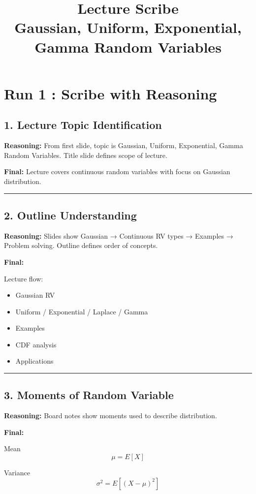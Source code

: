 \documentclass[12pt]{article}
\title{Lecture Scribe \\ Gaussian, Uniform, Exponential, Gamma Random Variables}
\author{}
\date{}
\begin{document}
\maketitle

\section*{Run 1 : Scribe with Reasoning}

\subsection*{1. Lecture Topic Identification}

\textbf{Reasoning:}  
From first slide, topic is Gaussian, Uniform, Exponential, Gamma Random Variables.  
Title slide defines scope of lecture.

\textbf{Final:}  
Lecture covers continuous random variables with focus on Gaussian distribution.

\hrule

\subsection*{2. Outline Understanding}

\textbf{Reasoning:}  
Slides show Gaussian → Continuous RV types → Examples → Problem solving.  
Outline defines order of concepts.

\textbf{Final:}

Lecture flow:

\begin{itemize}
\item Gaussian RV
\item Uniform / Exponential / Laplace / Gamma
\item Examples
\item CDF analysis
\item Applications
\end{itemize}

\hrule

\subsection*{3. Moments of Random Variable}

\textbf{Reasoning:}  
Board notes show moments used to describe distribution.

\textbf{Final:}

Mean
\[
\mu = E[X]
\]

Variance
\[
\sigma^2 = E[(X-\mu)^2]
\]
\end{document}
